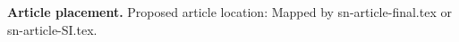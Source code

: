 \textbf{Article placement.} Proposed article location: Mapped by sn-article-final.tex or sn-article-SI.tex.
